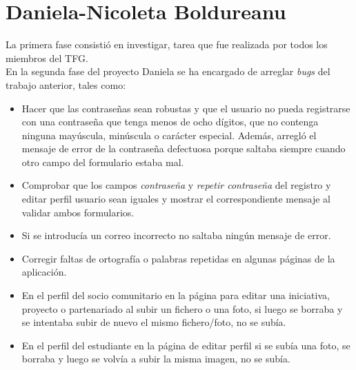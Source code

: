 \documentclass[11pt]{book}
\begin{document}
\section{Daniela-Nicoleta Boldureanu}
La primera fase consistió en investigar, tarea que fue realizada por todos los miembros del TFG.\\
En la segunda fase del proyecto Daniela se ha encargado de arreglar \textit{bugs} del trabajo anterior, tales como:
\begin{itemize} 
	\item Hacer que las contraseñas sean robustas y que el usuario no pueda registrarse con una contraseña que tenga menos de ocho dígitos, que no contenga ninguna mayúscula, minúscula o carácter especial. Además, arregló el mensaje de error de la contraseña defectuosa porque saltaba siempre cuando otro campo del formulario estaba mal.
	\item Comprobar que los campos \emph{contraseña} y \emph{repetir contraseña} del registro y editar perfil usuario sean iguales y mostrar el correspondiente mensaje al validar ambos formularios.
	\item Si se introducía un correo incorrecto no saltaba ningún mensaje de error.
	\item Corregir faltas de ortografía o palabras repetidas en algunas páginas de la aplicación.
	\item En el perfil del socio comunitario en la página para editar una iniciativa, proyecto o partenariado al subir un fichero o una foto, si luego se borraba y se intentaba subir de nuevo el mismo fichero/foto, no se subía.
	\item En el perfil del estudiante en la página de editar perfil si se subía una foto, se borraba y luego se volvía a subir la misma imagen, no se subía.
\end{itemize}
\end{document}
